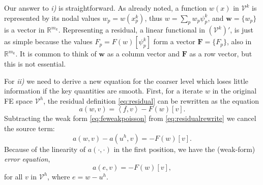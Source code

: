 \documentclass[letterpaper,final,12pt,reqno]{amsart}
\theoremstyle{claim}
\newcommand{\RR}{\mathbb{R}}
\newcommand{\bw}{\mathbf{w}}
\newcommand{\bF}{\mathbf{F}}
\newcommand{\ip}[2]{\left<#1,#2\right>}
\numberwithin{equation}{section}
\numberwithin{figure}{section}
\numberwithin{table}{section}
\begin{document}
Our answer to \emph{i)} is straightforward.  As already noted, a function $w(x)$ in $\mathcal{V}^k$ is represented by its nodal values $w_p=w(x_p^k)$, thus $w = \sum_p w_p \psi_p^k$, and $\bw = \{w_p\}$ is a vector in $\RR^{m_k}$.  Representing a residual, a linear functional in $(\mathcal{V}^k)'$, is just as simple because the values $F_p = F(w)[\psi_p^k]$ form a vector $\bF=\{F_p\}$, also in $\RR^{m_k}$.  It is common to think of $\bw$ as a column vector and $\bF$ as a row vector, but this is not essential.

For \emph{ii)} we need to derive a new equation for the coarser level which loses little information if the key quantities are smooth.  First, for a iterate $w$ in the original FE space $\mathcal{V}^h$, the residual definition \eqref{eq:residual} can be rewritten as the equation
\begin{equation}
  a(w,v) = \ip{f}{v} - F(w)[v].  \label{eq:residualrewrite}
\end{equation}
Subtracting the weak form \eqref{eq:feweakpoisson} from \eqref{eq:residualrewrite} we cancel the source term:
\begin{equation}
  a(w,v) - a(u^h,v) = - F(w)[v].  \label{eq:errorequationearly}
\end{equation}
Because of the linearity of $a(\cdot,\cdot)$ in the first position, we have the (weak-form) \emph{error equation},
\begin{equation}
  a(e,v) = - F(w)[v],  \label{eq:errorequation}
\end{equation}
for all $v$ in $\mathcal{V}^h$, where $e=w-u^h$.
\end{document}
